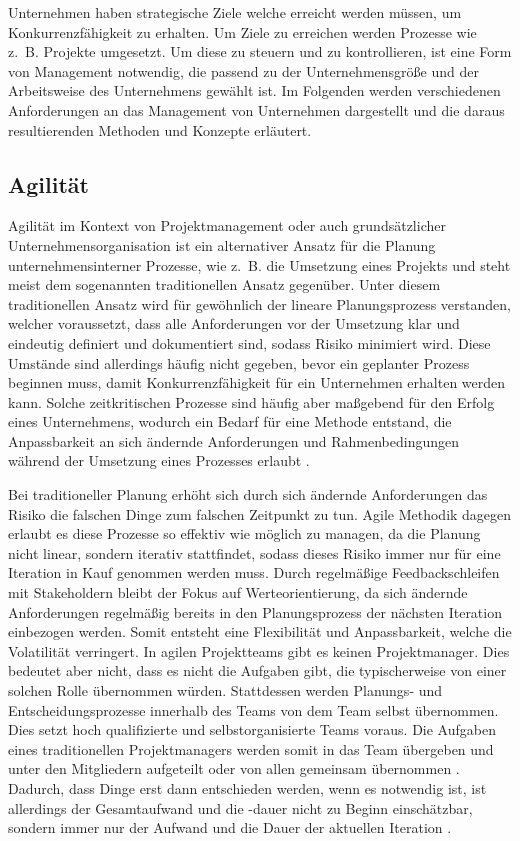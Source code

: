 Unternehmen haben strategische Ziele welche erreicht werden müssen, um Konkurrenzfähigkeit zu erhalten. Um Ziele zu erreichen werden Prozesse wie z. B. Projekte umgesetzt. Um diese zu steuern und zu kontrollieren, ist eine Form von Management notwendig, die passend zu der Unternehmensgröße und der Arbeitsweise des Unternehmens gewählt ist. Im Folgenden werden verschiedenen Anforderungen an das Management von Unternehmen dargestellt und die daraus resultierenden Methoden und Konzepte erläutert.

\subsection{Agilität}
Agilität im Kontext von Projektmanagement oder auch grundsätzlicher Unternehmensorganisation ist ein alternativer Ansatz für die Planung unternehmensinterner Prozesse, wie z. B. die Umsetzung eines Projekts und steht meist dem sogenannten traditionellen Ansatz gegenüber. Unter diesem traditionellen Ansatz wird für gewöhnlich der lineare Planungsprozess verstanden, welcher voraussetzt, dass alle Anforderungen vor der Umsetzung klar und eindeutig definiert und dokumentiert sind, sodass Risiko minimiert wird. Diese Umstände sind allerdings häufig nicht gegeben, bevor ein geplanter Prozess beginnen muss, damit Konkurrenzfähigkeit für ein Unternehmen erhalten werden kann. Solche zeitkritischen Prozesse sind häufig aber maßgebend für den Erfolg eines Unternehmens, wodurch ein Bedarf für eine Methode entstand, die Anpassbarkeit an sich ändernde Anforderungen und Rahmenbedingungen während der Umsetzung eines Prozesses erlaubt \cite{agilismVsTranditionalApproaches}.

Bei traditioneller Planung erhöht sich durch sich ändernde Anforderungen das Risiko die falschen Dinge zum falschen Zeitpunkt zu tun. Agile Methodik  dagegen erlaubt es diese Prozesse so effektiv wie möglich zu managen, da die Planung nicht linear, sondern iterativ stattfindet, sodass dieses Risiko immer nur für eine Iteration in Kauf genommen werden muss. Durch regelmäßige Feedbackschleifen mit Stakeholdern bleibt der Fokus auf Werteorientierung, da sich ändernde Anforderungen regelmäßig bereits in den Planungsprozess der nächsten Iteration einbezogen werden. Somit entsteht eine Flexibilität und Anpassbarkeit, welche die Volatilität verringert. In agilen Projektteams gibt es keinen Projektmanager. Dies bedeutet aber nicht, dass es nicht die Aufgaben gibt, die typischerweise von einer solchen Rolle übernommen würden. Stattdessen werden Planungs- und Entscheidungsprozesse innerhalb des Teams von dem Team selbst übernommen. Dies setzt hoch qualifizierte und selbstorganisierte Teams voraus. Die Aufgaben eines traditionellen Projektmanagers werden somit in das Team übergeben und unter den Mitgliedern aufgeteilt oder von allen gemeinsam übernommen \cite{TheRoleofProjectManagerinAgileSoftwareTeams}.
Dadurch, dass Dinge erst dann entschieden werden, wenn es notwendig ist, ist allerdings der Gesamtaufwand und die -dauer nicht zu Beginn einschätzbar, sondern immer nur der Aufwand und die Dauer der aktuellen Iteration \cite{agilismVsTranditionalApproaches}.


